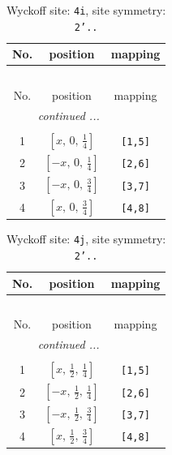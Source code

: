 \documentclass[fleqn,8pt]{jsarticle}
\begin{document}
\begin{longtable}{ccc}
\caption{Wyckoff site: {\tt 4i}, site symmetry: {\tt 2'..}}
 \\
 \hline \hline
No. & position & mapping \\ \hline \endfirsthead

\multicolumn{2}{l}{\tablename\ \thetable{}} \\
 \hline \hline
No. & position & mapping \\ \hline \endhead

 \hline \hline
\multicolumn{2}{r}{\footnotesize\it continued ...} \\ \endfoot

 \hline \hline
\multicolumn{2}{r}{} \\ \endlastfoot

1 & $\left[ x,\, 0,\, \frac{1}{4} \right]$ & {\tt [1,5]} \\ \hline
2 & $\left[ - x,\, 0,\, \frac{1}{4} \right]$ & {\tt [2,6]} \\ \hline
3 & $\left[ - x,\, 0,\, \frac{3}{4} \right]$ & {\tt [3,7]} \\ \hline
4 & $\left[ x,\, 0,\, \frac{3}{4} \right]$ & {\tt [4,8]} \\
\end{longtable}
\renewcommand{\arraystretch}{1.2}
\begin{longtable}{ccc}
\caption{Wyckoff site: {\tt 4j}, site symmetry: {\tt 2'..}}
 \\
 \hline \hline
No. & position & mapping \\ \hline \endfirsthead

\multicolumn{2}{l}{\tablename\ \thetable{}} \\
 \hline \hline
No. & position & mapping \\ \hline \endhead

 \hline \hline
\multicolumn{2}{r}{\footnotesize\it continued ...} \\ \endfoot

 \hline \hline
\multicolumn{2}{r}{} \\ \endlastfoot

1 & $\left[ x,\, \frac{1}{2},\, \frac{1}{4} \right]$ & {\tt [1,5]} \\ \hline
2 & $\left[ - x,\, \frac{1}{2},\, \frac{1}{4} \right]$ & {\tt [2,6]} \\ \hline
3 & $\left[ - x,\, \frac{1}{2},\, \frac{3}{4} \right]$ & {\tt [3,7]} \\ \hline
4 & $\left[ x,\, \frac{1}{2},\, \frac{3}{4} \right]$ & {\tt [4,8]} \\
\end{longtable}
\end{document}
